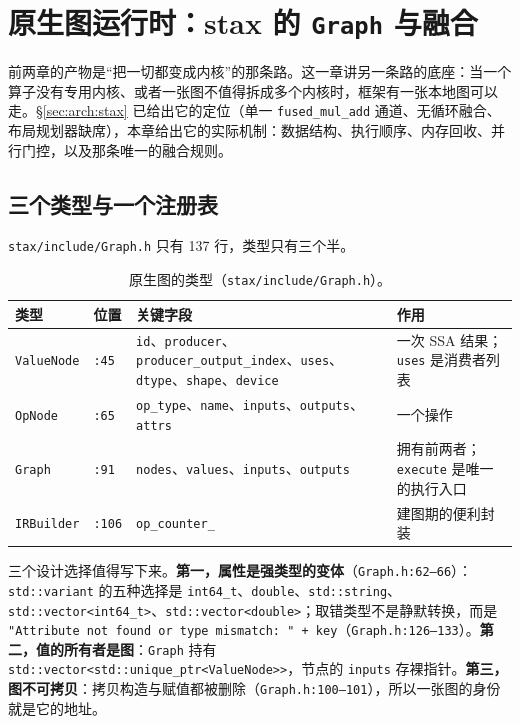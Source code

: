 \section{原生图运行时：stax 的 \texorpdfstring{\texttt{Graph}}{Graph} 与融合}
\label{sec:compile:native}

前两章的产物是“把一切都变成内核”的那条路。这一章讲另一条路的底座：当一个算子没有专用内核、或者一张图不值得拆成多个内核时，框架有一张本地图可以走。\S\ref{sec:arch:stax} 已给出它的定位（单一 \texttt{fused\_mul\_add} 通道、无循环融合、布局规划器缺席），本章给出它的实际机制：数据结构、执行顺序、内存回收、并行门控，以及那条唯一的融合规则。

\subsection{三个类型与一个注册表}

\texttt{stax/include/Graph.h} 只有 137 行，类型只有三个半。

\begin{table}[H]
\centering
\caption{原生图的类型（\texttt{stax/include/Graph.h}）。}
\label{tab:ng:types}
\small
\begin{tabular}{llll}
\toprule
类型 & 位置 & 关键字段 & 作用 \\
\midrule
\texttt{ValueNode} & \texttt{:45} & \texttt{id}、\texttt{producer}、\texttt{producer\_output\_index}、\texttt{uses}、\texttt{dtype}、\texttt{shape}、\texttt{device} & 一次 SSA 结果；\texttt{uses} 是消费者列表 \\
\texttt{OpNode} & \texttt{:65} & \texttt{op\_type}、\texttt{name}、\texttt{inputs}、\texttt{outputs}、\texttt{attrs} & 一个操作 \\
\texttt{Graph} & \texttt{:91} & \texttt{nodes}、\texttt{values}、\texttt{inputs}、\texttt{outputs} & 拥有前两者；\texttt{execute} 是唯一的执行入口 \\
\texttt{IRBuilder} & \texttt{:106} & \texttt{op\_counter\_} & 建图期的便利封装 \\
\bottomrule
\end{tabular}
\end{table}

三个设计选择值得写下来。\textbf{第一，属性是强类型的变体}（\texttt{Graph.h:62--66}）：\texttt{std::variant} 的五种选择是 \texttt{int64\_t}、\texttt{double}、\texttt{std::string}、\texttt{std::vector<int64\_t>}、\texttt{std::vector<double>}；取错类型不是静默转换，而是 \texttt{"Attribute not found or type mismatch: " + key}（\texttt{Graph.h:126--133}）。\textbf{第二，值的所有者是图}：\texttt{Graph} 持有 \texttt{std::vector<std::unique\_ptr<ValueNode>>}，节点的 \texttt{inputs} 存裸指针。\textbf{第三，图不可拷贝}：拷贝构造与赋值都被删除（\texttt{Graph.h:100--101}），所以一张图的身份就是它的地址。

